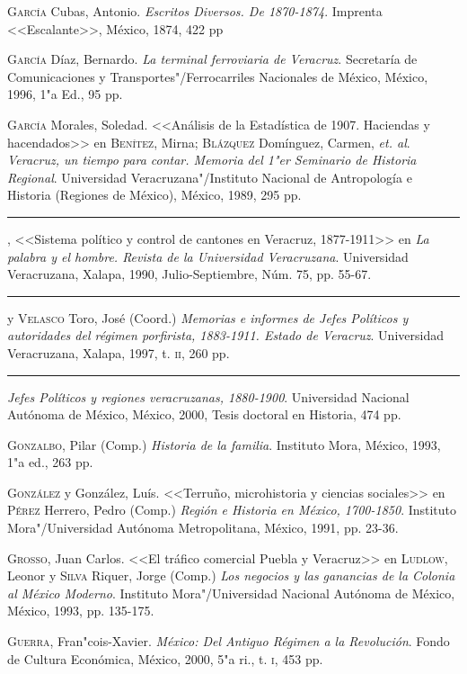 \documentclass[14pt,twoside,final]{extbook} %
\begin{document}
\textsc{García} Cubas, Antonio. \emph{Escritos Diversos. De 1870-1874}. Imprenta <<Escalante>>, México, 1874, 422 pp

\textsc{García} Díaz, Bernardo. \emph{La terminal ferroviaria de Veracruz}. Secretaría de Comunicaciones y Transportes"/Ferrocarriles Nacionales de México, México, 1996, 1"a Ed., 95 pp.

\textsc{García} Morales, Soledad. <<Análisis de la Estadística de 1907. Haciendas y
hacendados>> en \textsc{Benítez}, Mirna; \textsc{Blázquez} Domínguez, Carmen,
\emph{et. al}. \emph{Veracruz, un tiempo para contar. Memoria del 1"er Seminario de Historia Regional}. Universidad Veracruzana"/Instituto Nacional de Antropología e Historia (Regiones de México), México, 1989, 295 pp.

\rule{1cm}{0.4pt}, <<Sistema político y control de cantones en Veracruz, 1877-1911>> en \emph{La palabra y el hombre. Revista de la Universidad Veracruzana}. Universidad Veracruzana, Xalapa, 1990, Julio-Septiembre, Núm. 75, pp. 55-67.

\rule{1cm}{0.4pt} y \textsc{Velasco} Toro, José (Coord.) \emph{Memorias e informes de Jefes Políticos y autoridades del régimen porfirista, 1883-1911. Estado de Veracruz}. Universidad
Veracruzana, Xalapa, 1997, t. \textsc{ii}, 260 pp.

\rule{1cm}{0.4pt} \emph{Jefes Políticos y regiones veracruzanas, 1880-1900}. Universidad Nacional Autónoma de México, México, 2000, Tesis doctoral en Historia, 474 pp.

\textsc{Gonzalbo}, Pilar (Comp.) \emph{Historia de la familia}. Instituto Mora, México, 1993, 1"a ed., 263 pp.

\textsc{González} y González, Luís. <<Terruño, microhistoria y ciencias sociales>> en \textsc{Pérez} Herrero, Pedro (Comp.) \emph{Región e Historia en México, \mbox{1700-1850}}. Instituto Mora"/Universidad Autónoma Metropolitana, México, 1991, pp. 23-36.

\textsc{Grosso}, Juan Carlos. <<El tráfico comercial Puebla y Veracruz>> en \textsc{Ludlow}, Leonor y \textsc{Silva} Riquer, Jorge (Comp.) \emph{Los negocios y las ganancias de la Colonia al México Moderno}. Instituto Mora"/Universidad Nacional Autónoma de México, México, 1993, pp. 135-175.

\textsc{Guerra}, Fran"cois-Xavier. \emph{México: Del Antiguo Régimen a la Revolución}. Fondo de Cultura Económica, México, 2000, 5"a ri., t. \textsc{i}, 453 pp.
\end{document}
